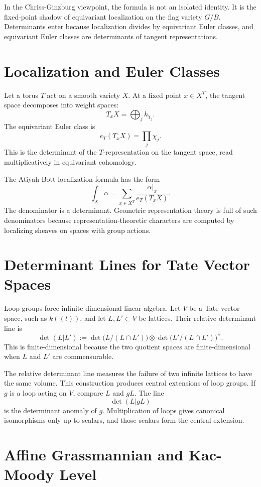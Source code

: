 \documentclass[11pt]{memoir}
\begin{document}
In the Chriss-Ginzburg viewpoint, the formula is not an isolated
identity. It is the fixed-point shadow of equivariant localization on
the flag variety \(G/B\). Determinants enter because localization
divides by equivariant Euler classes, and equivariant Euler classes
are determinants of tangent representations.

\section{Localization and Euler Classes}
\label{sec:localization}

Let a torus \(T\) act on a smooth variety \(X\). At a fixed point
\(x\in X^T\), the tangent space decomposes into weight spaces:
\[
  T_xX=\bigoplus_j k_{\chi_j}.
\]
The equivariant Euler class is
\[
  e_T(T_xX)=\prod_j\chi_j.
\]
This is the determinant of the \(T\)-representation on the tangent
space, read multiplicatively in equivariant cohomology.

The Atiyah-Bott localization formula has the form
\[
  \int_X\alpha
  =
  \sum_{x\in X^T}
  \frac{\alpha|_x}{e_T(T_xX)}.
\]
The denominator is a determinant. Geometric representation theory is
full of such denominators because representation-theoretic characters
are computed by localizing sheaves on spaces with group actions.

\section{Determinant Lines for Tate Vector Spaces}
\label{sec:tate-det-lines}

Loop groups force infinite-dimensional linear algebra. Let \(V\) be a
Tate vector space, such as \(k((t))\), and let \(L,L'\subset V\) be
lattices. Their relative determinant line is
\[
  \det(L|L')
  :=
  \det\bigl(L/(L\cap L')\bigr)
  \otimes
  \det\bigl(L'/(L\cap L')\bigr)^\vee.
\]
This is finite-dimensional because the two quotient spaces are
finite-dimensional when \(L\) and \(L'\) are commensurable.

The relative determinant line measures the failure of two infinite
lattices to have the same volume. This construction produces central
extensions of loop groups. If \(g\) is a loop acting on \(V\), compare
\(L\) and \(gL\). The line
\[
  \det(L|gL)
\]
is the determinant anomaly of \(g\). Multiplication of loops gives
canonical isomorphisms only up to scalars, and those scalars form the
central extension.

\section{Affine Grassmannian and Kac-Moody Level}
\label{sec:affine-grassmannian}
\end{document}

